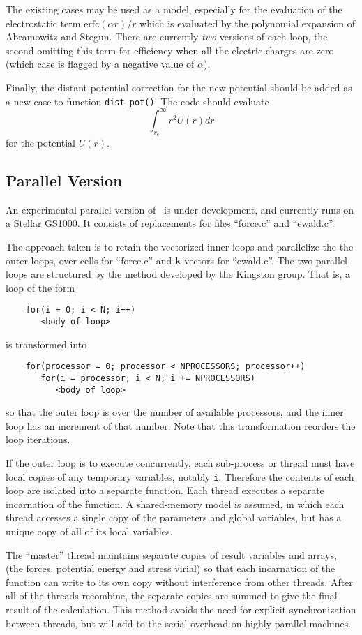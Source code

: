The  existing  cases  may  be  used as  a    model, especially for the
evaluation of the electrostatic term $\mbox{erfc}(\alpha r) / r$ which
is    evaluated  by  the   polynomial  expansion    of  Abramowitz and
Stegun\cite[section 7.1.26]{abramowitz:70}. There  are  currently {\em
two}   versions of each    loop,  the   second omitting this  term for
efficiency when  all the  electric  charges  are  zero  (which case is
flagged by a negative value of $\alpha$).

Finally, the distant potential correction for the new potential should
be added as a new case to function \verb'dist_pot()'. The code should evaluate
\[
\int^{\infty}_{r_c} r^2 U(r) dr
\]
for the potential $U(r)$.
\subsection{Parallel Version}
An experimental parallel version of \moldy\  is under development, and
currently runs on a Stellar GS1000.   It consists of replacements for
files ``force.c'' and ``ewald.c''. 

The approach taken is to retain the vectorized inner loops and
parallelize the the outer loops, over cells for ``force.c'' and {\bf
k} vectors for ``ewald.c''.  The two parallel loops are structured by
the method developed by the Kingston group\cite{wojcik:85}. That is, a
loop of the form
\begin{verbatim}
	for(i = 0; i < N; i++)
	   <body of loop>
\end{verbatim}
is transformed into
\begin{verbatim}
	for(processor = 0; processor < NPROCESSORS; processor++)
	   for(i = processor; i < N; i += NPROCESSORS)
	      <body of loop>
\end{verbatim}
so that the outer loop is over the number of available processors,
and the inner loop has an increment of that number.  Note that this
transformation reorders the loop iterations.

If the outer loop is to execute concurrently, each sub-process or
thread must have local copies of any temporary variables, notably
\verb'i'.  Therefore the contents of each loop are isolated into a
separate function. Each thread executes a separate incarnation
of the function.  A shared-memory model is assumed, in which each
thread accesses a single copy of the parameters and global
variables, but has a unique copy of all of its local variables.

The ``master'' thread maintains separate copies of result variables
and arrays, (\ie the forces, potential energy and stress virial) so
that each incarnation of the function can write to its own copy
without interference from other threads.  After all of the threads
recombine, the separate copies are summed to give the final result of
the calculation.  This method avoids the need for explicit
synchronization between threads, but will add to the serial overhead
on highly parallel machines.

